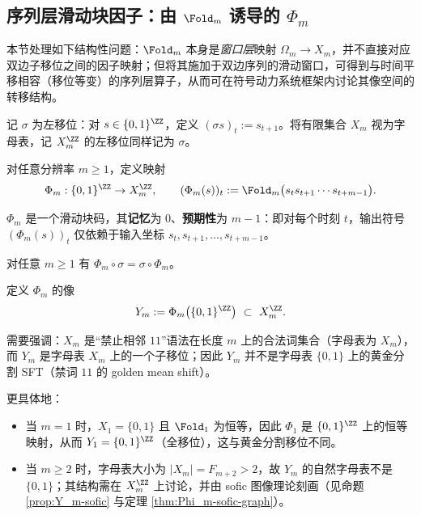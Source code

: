 \subsection{序列层滑动块因子：由 \texorpdfstring{$\Fold_m$}{Fold\_m} 诱导的 \texorpdfstring{$\Phi_m$}{Phi\_m}}\label{subsec:Phi_m-sliding-block-factor}

本节处理如下结构性问题：$\Fold_m$ 本身是\emph{窗口层}映射 $\Omega_m\to X_m$，并不直接对应双边子移位之间的因子映射；但将其施加于双边序列的滑动窗口，可得到与时间平移相容（移位等变）的序列层算子，从而可在符号动力系统框架内讨论其像空间的转移结构。

记 $\sigma$ 为左移位：对 $s\in\{0,1\}^{\ZZ}$，定义 $(\sigma s)_t:=s_{t+1}$。将有限集合 $X_m$ 视为字母表，记 $X_m^{\ZZ}$ 的左移位同样记为 $\sigma$。

\begin{definition}\label{def:Phi_m}
对任意分辨率 $m\ge 1$，定义映射
\[
\Phi_m:\{0,1\}^{\ZZ}\to X_m^{\ZZ},\qquad
(\Phi_m(s))_t:=\Fold_m\bigl(s_t s_{t+1}\cdots s_{t+m-1}\bigr).
\]
\end{definition}

\begin{proposition}\label{prop:Phi_m-radius}
$\Phi_m$ 是一个滑动块码，其\textbf{记忆}为 $0$、\textbf{预期性}为 $m-1$：即对每个时刻 $t$，输出符号 $(\Phi_m(s))_t$ 仅依赖于输入坐标
\(
s_t,s_{t+1},\dots,s_{t+m-1}
\)。
\end{proposition}

\begin{proposition}\label{prop:Phi_m-equivariant}
对任意 $m\ge 1$ 有 $\Phi_m\circ\sigma=\sigma\circ\Phi_m$。
\end{proposition}

\begin{definition}[像空间]\label{def:Y_m}
定义 $\Phi_m$ 的像
\[
Y_m:=\Phi_m\bigl(\{0,1\}^{\ZZ}\bigr)\ \subset\ X_m^{\ZZ}.
\]
\end{definition}

\begin{remark}\label{rem:Ym-not-golden-mean}
需要强调：$X_m$ 是“禁止相邻 $11$”语法在长度 $m$ 上的合法词集合（字母表为 $X_m$），而 $Y_m$ 是字母表 $X_m$ 上的一个子移位；因此 $Y_m$ 并不是字母表 $\{0,1\}$ 上的黄金分割 SFT（禁词 $11$ 的 golden mean shift）。

更具体地：
\begin{itemize}
  \item 当 $m=1$ 时，$X_1=\{0,1\}$ 且 $\Fold_1$ 为恒等，因此 $\Phi_1$ 是 $\{0,1\}^{\ZZ}$ 上的恒等映射，从而 $Y_1=\{0,1\}^{\ZZ}$（全移位），这与黄金分割移位不同。
  \item 当 $m\ge 2$ 时，字母表大小为 $|X_m|=F_{m+2}>2$，故 $Y_m$ 的自然字母表不是 $\{0,1\}$；其结构需在 $X_m^{\ZZ}$ 上讨论，并由 sofic 图像理论刻画（见命题 \ref{prop:Y_m-sofic} 与定理 \ref{thm:Phi_m-sofic-graph}）。
\end{itemize}
\end{remark}

